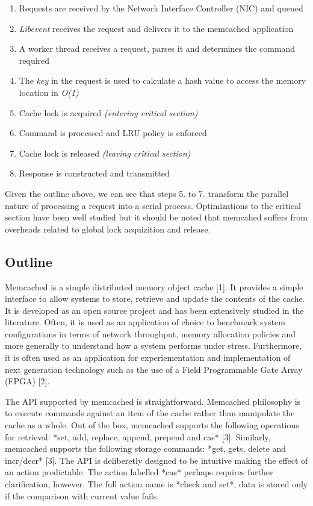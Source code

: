 \begin{enumerate}
    \item Requests are received by the Network Interface Controller (NIC) and queued
    \item \emph{Libevent} receives the request and delivers it to the memcached application
    \item A worker thread receives a request, parses it and determines the command required
    \item The \emph{key} in the request is used to calculate a hash value to access the memory location in \emph{O(1)}
    \item Cache lock is acquired \emph{(entering critical section)}
    \item Command is processed and LRU policy is enforced
    \item Cache lock is released \emph{(leaving critical section)}
    \item Response is constructed and transmitted
\end{enumerate}

Given the outline above, we can see that steps 5. to 7. transform the parallel nature of processing a request into a serial process. Optimizations to the critical section have been well studied but it should be noted that memcahed suffers from overheads related to global lock acquizition and release.

\subsection{Outline}
Memcached is a simple distributed memory object cache [1]. It provides a simple interface to allow systems to store, retrieve and update the contents of the cache. It is developed as an open source project and has been extensively studied in the literature. Often, it is used as an application of choice to benchmark system configurations in terms of network
throughput, memory allocation policies and more generally to understand how a system performs under stress. Furthermore, it is often used as an application for experiementation and implementation of next generation technology such as the use of a Field Programmable Gate Array (FPGA) [2].

The API supported by memcached is straightforward. Memcached philosophy is to execute commands against an item of the cache rather than manipulate the cache as a whole. Out of the box, memcached supports the following operations for retrieval: *set, add, replace, append, prepend and cas* [3]. Similarly, memcached supports the following storage commands: *get, gets, delete and incr/decr* [3]. The API is deliberetly designed to be intuitive making the effect of an action predictable. The action labelled *cas* perhaps requires further clarification, however. The full action name is *check and set*, data is stored only if the comparison with current value fails.

